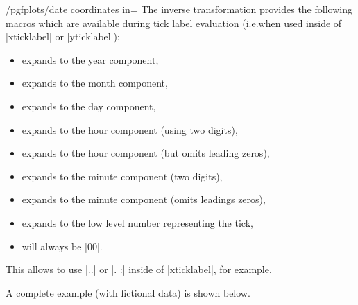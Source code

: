 {\begin{stylekey}{/pgfplots/date coordinates in=}
    The inverse transformation provides the following macros which are
    available during tick label evaluation (i.e.\@ when used inside of
    |xticklabel| or |yticklabel|):
    \begin{itemize}
        \item \declareandlabel{\year} expands to the year component,
        \item \declareandlabel{\month} expands to the month component,
        \item \declareandlabel{\day} expands to the day component,
        \item \declareandlabel{\hour} expands to the hour component (using
            two digits),
        \item \declareandlabel{\Hour} expands to the hour component (but
            omits leading zeros),
        \item \declareandlabel{\minute} expands to the minute component (two
            digits),
        \item \declareandlabel{\Minute} expands to the minute component
            (omits leadings zeros),
        \item \declareandlabel{\lowlevel} expands to the low level number
            representing the tick,
        \item \declareandlabel{\second} will always be |00|.
    \end{itemize}
    This allows to use |\day.\month.\year| or |\day. \hour:\minute| inside of
    |xticklabel|, for example.

    A complete example (with fictional data) is shown below.
\begin{codeexample}[]


\end{codeexample}


\end{stylekey}}
